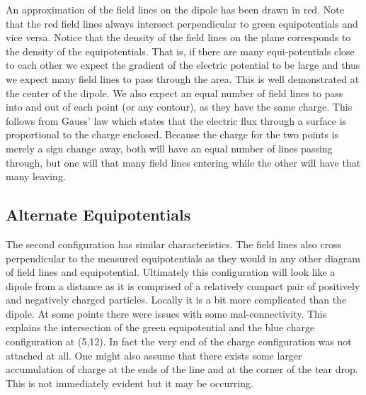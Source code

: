\documentclass[11pt]{article}
\begin{document}
An approximation of the field lines on the dipole has been drawn in red. Note that the red field lines always intersect perpendicular to green equipotentials and vice versa. Notice that the density of the field lines on the plane corresponds to the density of the equipotentials. That is, if there are many equi-potentials close to each other we expect the gradient of the electric potential to be large and thus we expect many field lines to pass through the area. This is well demonstrated at the center of the dipole. We also expect an equal number of field lines to pass into and out of each point (or any contour), as they have the same charge. This follows from Gauss' law which states that the electric flux through a surface is proportional to the charge enclosed. Because the charge for the two points is merely a sign change away, both will have an equal number of lines passing through, but one will that many field lines entering while the other will have that many leaving.

\subsection{Alternate Equipotentials}
The second configuration has similar characteristics. The field lines also cross perpendicular to the measured equipotentials as they would in any other diagram of field lines and equipotential. Ultimately this configuration will look like a dipole from a distance as it is comprised of a relatively compact pair of positively and negatively charged particles. Locally it is a bit more complicated than the dipole. At some points there were issues with some mal-connectivity. This explains the intersection of the green equipotential and the blue charge configuration at (5,12). In fact the very end of the charge configuration was not attached at all. One might also assume that there exists some larger accumulation of charge at the ends of the line and at the corner of the tear drop. This is not immediately evident but it may be occurring.
\end{document}
